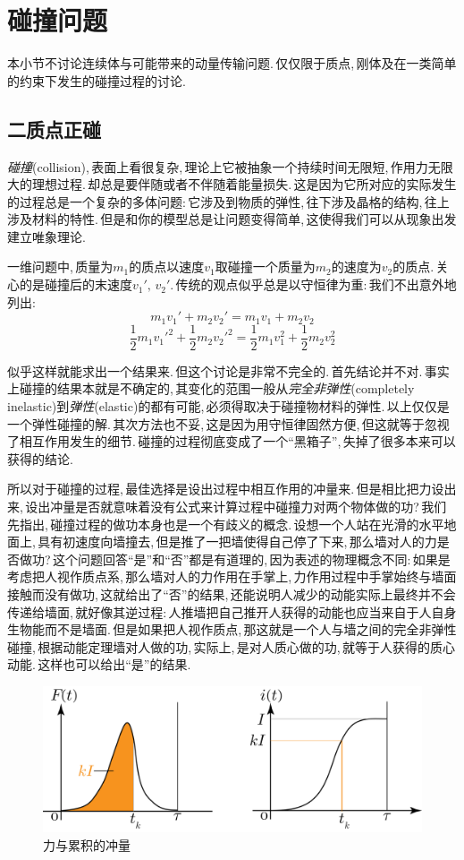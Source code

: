 \section{碰撞问题}
本小节不讨论连续体与可能带来的动量传输问题.\,仅仅限于质点,\,刚体及在一类简单的约束下发生的碰撞过程的讨论.

\subsection{二质点正碰}
\emph{碰撞}(collision),\,表面上看很复杂,\,理论上它被抽象一个持续时间无限短,\,作用力无限大的理想过程.\,却总是要伴随或者不伴随着能量损失.\,这是因为它所对应的实际发生的过程总是一个复杂的多体问题:\,它涉及到物质的弹性,\,往下涉及晶格的结构,\,往上涉及材料的特性.\,但是和你的模型总是让问题变得简单,\,这使得我们可以从现象出发建立唯象理论.

一维问题中,\,质量为$m_1$的质点以速度$v_1$取碰撞一个质量为$m_2$的速度为$v_2$的质点.\,关心的是碰撞后的末速度$v_1',\,v_2'$.\,传统的观点似乎总是以守恒律为重:\,我们不出意外地列出:
\[m_1v_1'+m_2v_2'=m_1v_1+m_2v_2\]
\[\frac{1}{2}m_1v_1'^2+\frac{1}{2}m_2v_2'^2=\frac{1}{2}m_1v_1^2+\frac{1}{2}m_2v_2^2\]

似乎这样就能求出一个结果来.\,但这个讨论是非常不完全的.\,首先结论并不对.\,事实上碰撞的结果本就是不确定的,\,其变化的范围一般从\emph{完全非弹性}(completely inelastic)到\emph{弹性}(elastic)的都有可能,\,必须得取决于碰撞物材料的弹性.\,以上仅仅是一个弹性碰撞的解.\,其次方法也不妥,\,这是因为用守恒律固然方便,\,但这就等于忽视了相互作用发生的细节.\,碰撞的过程彻底变成了一个``黑箱子'',\,失掉了很多本来可以获得的结论.

所以对于碰撞的过程,\,最佳选择是设出过程中相互作用的冲量来.\,但是相比把力设出来,\,设出冲量是否就意味着没有公式来计算过程中碰撞力对两个物体做的功?\,我们先指出,\,碰撞过程的做功本身也是一个有歧义的概念.\,设想一个人站在光滑的水平地面上,\,具有初速度向墙撞去,\,但是推了一把墙使得自己停了下来,\,那么墙对人的力是否做功?\,这个问题回答``是''和``否''都是有道理的,\,因为表述的物理概念不同:\,如果是考虑把人视作质点系,\,那么墙对人的力作用在手掌上,\,力作用过程中手掌始终与墙面接触而没有做功,\,这就给出了``否''的结果,\,还能说明人减少的动能实际上最终并不会传递给墙面,\,就好像其逆过程:\,人推墙把自己推开人获得的动能也应当来自于人自身生物能而不是墙面.\,但是如果把人视作质点,\,那这就是一个人与墙之间的完全非弹性碰撞,\,根据动能定理墙对人做的功,\,实际上,\,是对人质心做的功,\,就等于人获得的质心动能.\,这样也可以给出``是''的结果.

\begin{figure}[H]
\centering
\includegraphics[width=16cm]{image/6-1-12.png}
\caption{力与累积的冲量}
\end{figure}


